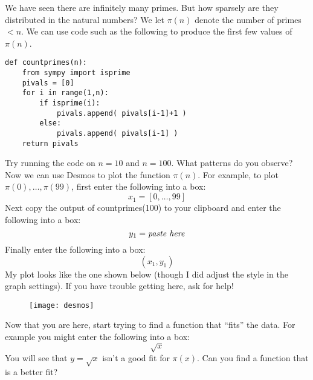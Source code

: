 \documentclass[12pt]{exam}
\begin{document}
\begin{questions}
  \question We have seen there are infinitely many primes. But how sparsely are they distributed in the natural numbers? We let $\pi(n)$ denote the number of primes $<n$. We can use code such as the following to produce the first few values of $\pi(n)$.
  
  \begin{lstlisting}
def countprimes(n):
    from sympy import isprime
    pivals = [0]
    for i in range(1,n):
        if isprime(i):
            pivals.append( pivals[i-1]+1 )
        else:
            pivals.append( pivals[i-1] )
    return pivals
  \end{lstlisting}
  
  Try running the code on $n=10$ and $n=100$. What patterns do you observe?
  \newpage
  \question Now we can use Desmos to plot the function $\pi(n)$. For example, to plot $\pi(0),\ldots,\pi(99)$, first enter the following into a box:
  \[x_1=[0,\ldots,99]
  \]
  Next copy the output of countprimes(100) to your clipboard and enter the following into a box:
  \[y_1=\emph{paste here}
  \]
  Finally enter the following into a box:
  \[(x_1,y_1)
  \]
  My plot looks like the one shown below (though I did adjust the style in the graph settings). If you have trouble getting here, ask for help!
  \begin{figure}[h]
    \centering
    \texttt{[image: desmos]}
  \end{figure}
  Now that you are here, start trying to find a function that ``fits'' the data. For example you might enter the following into a box:
  \[\sqrt{x}
  \]
  You will see that $y=\sqrt{x}$ isn't a good fit for $\pi(x)$. Can you find a function that is a better fit?
\end{questions}
\end{document}
